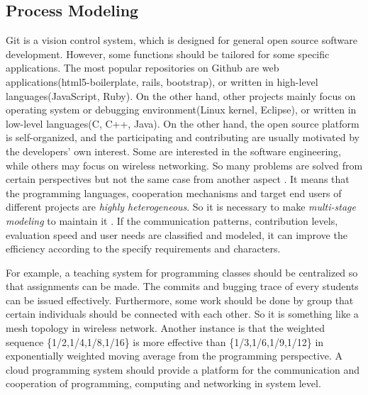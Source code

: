 \documentclass[draftclsnofoot,journal,onecolumn,12pt]{IEEEtran}
\begin{document}
\subsection{Process Modeling}
Git is a vision control system, which is designed for general open source software development. However, some functions should be tailored for some specific applications. The most popular repositories on Github are web applications(html5-boilerplate, rails, bootstrap), or written in high-level languages(JavaScript, Ruby). On the other hand, other projects mainly focus on operating system or debugging environment(Linux kernel, Eclipse), or written in low-level languages(C, C++, Java). On the other hand, the open source platform is self-organized, and the participating and contributing are usually motivated by the developers' own interest. Some are interested in the software engineering, while others may focus on wireless networking. So many problems are solved from certain perspectives but not the same case from another aspect \cite{Koblin}. It means that the programming languages, cooperation mechanisms and target end users of different projects are \textit{highly heterogeneous}. So it is necessary to make \textit{multi-stage modeling} to maintain it \cite{scacchi2006understanding}. If the communication patterns, contribution levels, evaluation speed and user needs are classified and modeled, it can improve the efficiency according to the specify requirements and characters.

For example, a teaching system for programming classes should be centralized so that assignments can be made. The commits and bugging trace of every students can be issued effectively. Furthermore, some work should be done by group that certain individuals should be connected with each other. So it is something like a mesh topology in wireless network. Another instance is that the weighted sequence \{1/2,1/4,1/8,1/16\} is more effective than \{1/3,1/6,1/9,1/12\} in exponentially weighted moving average from the programming perspective. A cloud programming system should provide a platform for the communication and cooperation of programming, computing and networking in system level.
%
\end{document}
